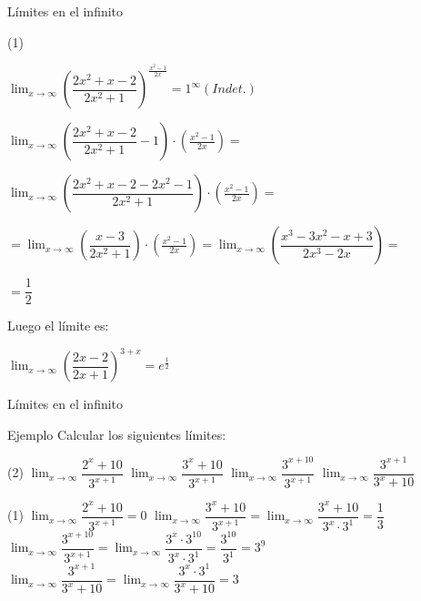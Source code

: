 \documentclass[8pt,handout]{beamer}
\newcommand{\limite}[2]{\displaystyle \lim_{x \rightarrow #1}{#2}}
\begin{document}
\begin{frame}{Límites en el infinito}
\begin{tasks}[label=\alph*),resume](1)

\task $\limite{\infty}{\left( \dfrac{2x^2+x-2}{2x^2+1}\right)^{\frac{x^2-1}{2x}}}=1^{\infty} (Indet.)$

\vspace{10pt}


$\limite{\infty}{\left( \dfrac{2x^2+x-2}{2x^2+1}-1\right)\cdot \left( \frac{x^2-1}{2x} \right)}= $
\vspace{10pt}


$\limite{\infty}{\left( \dfrac{2x^2+x-2-2x^2-1}{2x^2+1}\right)\cdot\left( \frac{x^2-1}{2x} \right)}= $

\vspace{10pt}

$= \limite{\infty}{\left( \dfrac{x-3}{2x^2+1}\right)\cdot\left( \frac{x^2-1}{2x} \right)}=
\limite{\infty}{\left( \dfrac{x^3-3x^2-x+3}{2x^3-2x}\right)}= $

\vspace{10pt}

$=\dfrac{1}{2}$

\vspace{10pt}

Luego el límite es: 

\vspace{10pt}
$\limite{\infty}{\left( \dfrac{2x-2}{2x+1}\right)^{3+x}}= e^{\frac{1}{2}}$


\end{tasks}
\end{frame}

\begin{frame}{Límites en el infinito}
\begin{exampleblock}{Ejemplo}
Calcular los siguientes límites:
\begin{tasks}[label=\alph*)](2)
\task $\limite{\infty}{\dfrac{2^x+10}{3^{x+1}}}$
\task $\limite{\infty}{\dfrac{3^x+10}{3^{x+1}}}$
\task $\limite{\infty}{\dfrac{3^{x+10}}{3^{x+1}}}$
\task $\limite{\infty}{\dfrac{3^{x+1}}{3^x+10}}$

\end{tasks}
\end{exampleblock}

\begin{tasks}[label=\alph*)](1)
\task $\limite{\infty}{\dfrac{2^x+10}{3^{x+1}}}= 0$
\task $\limite{\infty}{\dfrac{3^x+10}{3^{x+1}}}= \limite{\infty}{\dfrac{3^x+10}{3^x\cdot 3^1}}= \dfrac{1}{3} $
\task $\limite{\infty}{\dfrac{3^{x+10}}{3^{x+1}}}= \limite{\infty}{\dfrac{3^x\cdot 3^{10}}{3^x\cdot 3^1}}= \dfrac{3^{10}}{3^1}= 3^9$
\task $\limite{\infty}{\dfrac{3^{x+1}}{3^x+10}}= \limite{\infty}{\dfrac{3^x\cdot 3^1}{3^x+10}}= 3$

\end{tasks}

\end{frame}
\end{document}
